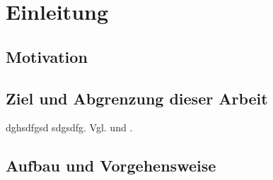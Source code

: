 \chapter{Einleitung}
\label{cha:Einleitung}

\section{Motivation}

\section{Ziel und Abgrenzung dieser Arbeit}
dghsdfgsd sdgsdfg. Vgl. \cite{Son:2013:LNA:2484028.2484064} und \cite{Magalhaes:2010:IFS:1852102.1852105}.

\section{Aufbau und Vorgehensweise}
